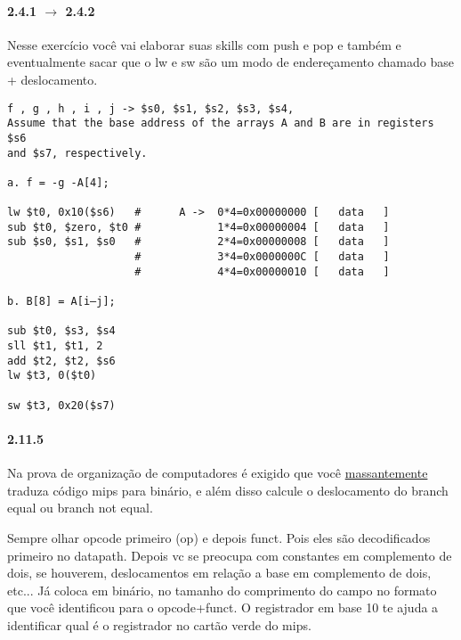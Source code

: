 \documentclass{article}
\begin{document}
\paragraph{2.4.1 $\rightarrow$ 2.4.2}

Nesse exercício você vai elaborar suas skills com push e pop e também e 
eventualmente sacar que o lw e sw são um modo de endereçamento chamado base + 
deslocamento.

\begin{verbatim}
f , g , h , i , j -> $s0, $s1, $s2, $s3, $s4,
Assume that the base address of the arrays A and B are in registers $s6
and $s7, respectively.

a. f = -g -A[4];

lw $t0, 0x10($s6)   #      A ->  0*4=0x00000000 [   data   ]
sub $t0, $zero, $t0 #            1*4=0x00000004 [   data   ]
sub $s0, $s1, $s0   #            2*4=0x00000008 [   data   ]
                    #            3*4=0x0000000C [   data   ]
                    #            4*4=0x00000010 [   data   ]

b. B[8] = A[i–j];

sub $t0, $s3, $s4
sll $t1, $t1, 2
add $t2, $t2, $s6
lw $t3, 0($t0)

sw $t3, 0x20($s7)
\end{verbatim}

\paragraph{2.11.5}

Na prova de organização de computadores é exigido que você
\underline{massantemente} traduza código mips para binário, e além disso calcule
o deslocamento do branch equal ou branch not equal.

Sempre olhar opcode primeiro (op) e depois funct. Pois eles são decodificados
primeiro no datapath. Depois vc se preocupa com constantes em complemento de
dois, se houverem, deslocamentos em relação a base em complemento de dois,
etc... Já coloca em binário, no tamanho do comprimento do campo no formato que 
você identificou para o opcode+funct. O registrador em base 10 te ajuda a 
identificar qual é o registrador no cartão verde do mips.
\end{document}
